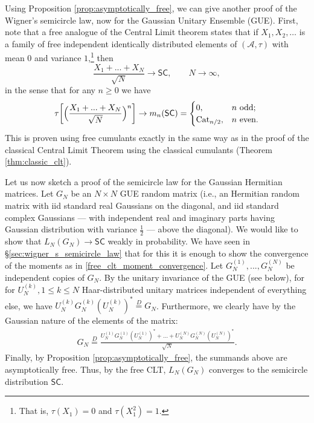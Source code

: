 \documentclass[letterpaper,11pt,oneside,reqno]{amsart}
\numberwithin{equation}{section}
\newcommand{\SC}{\mathsf{SC}}
\theoremstyle{definition}
\begin{document}
Using Proposition \ref{prop:asymptotically_free}, we can give another proof of the 
Wigner's semicircle law, now for the Gaussian Unitary Ensemble (GUE).
First, note that a free analogue of the Central Limit theorem
states that if $X_1,X_2,\ldots$ is a family of free independent 
identically distributed elements of $(\mathcal{A},\tau)$
with mean $0$ and variance $1$,\footnote{That is,
$\tau(X_1)=0$ and $\tau(X_1^{2})=1$.} then
\begin{equation*}
	\frac{X_1+...+X_N}{\sqrt{N}}\to \SC,\qquad N\to\infty,
\end{equation*}
in the sense that for any $n\ge0$ we have
\begin{equation}\label{free_clt_moment_convergence}
	\tau\bigg[\Big(\frac{X_1+...+X_N}{\sqrt{N}}\Big)^{n}\bigg]\to m_n(\SC)=
	\begin{cases}
		0,&\textnormal{$n$ odd};\\
		\mathrm{Cat}_{n/2},
		&\textnormal{$n$ even}.
	\end{cases}
\end{equation}
This is proven using free cumulants exactly in the same way as in
the proof of the classical Central Limit Theorem using the classical
cumulants (Theorem \ref{thm:classic_clt}).
	
Let us now sketch a proof of the semicircle law for the Gaussian Hermitian matrices.
Let $G_N$ be an $N\times N$ GUE random matrix (i.e., an Hermitian random
matrix with iid standard real Gaussians on the diagonal, 
and iid standard complex Gaussians --- with independent
real and imaginary parts having Gaussian distribution with variance $\frac 12$
--- above the diagonal). We would like to show that
$L_N(G_N)\to\SC$ weakly in probability. We have seen in \S \ref{sec:wigner_s_semicircle_law} that
for this it is enough to show the convergence of the moments as in \eqref{free_clt_moment_convergence}.
Let $G_N^{(1)},...,G_N^{(N)}$ be independent copies of $G_N$.
By the unitary invariance of the GUE (see  below), for 
for $U_N^{(k)}, 1\leq k\leq N$ Haar-distributed unitary matrices independent of everything else, we have 
$U_N^{(k)}G_N^{(k)}(U_N^{(k)})^*\stackrel{D}{=} G_N$.
Furthermore, we clearly have by the Gaussian nature of the elements of the matrix:
\begin{align*}
    G_N\stackrel{D}{=}\frac{U_N^{(1)}G_N^{(1)}(U^{(1)}_N)^*+...+U_N^{(N)}G_N^{(N)}(U_N^{(N)})^*}{\sqrt{N}}.
\end{align*}
Finally, by Proposition \ref{prop:asymptotically_free},
the summands above are asymptotically free. Thus, by the free CLT,
$L_N(G_N)$ converges to the semicircle distribution $\SC$. 
\end{document}
